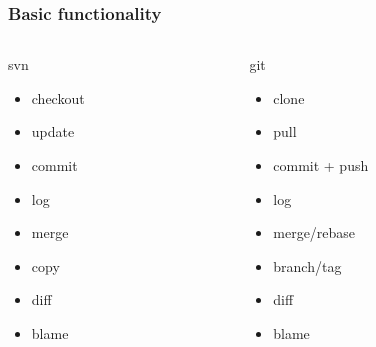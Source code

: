 \begin{frame}
	\frametitle{Basic functionality}
	\begin{columns}
		\begin{column}{0.49\textwidth}
			\begin{block}{svn}
				\begin{itemize}
					\item checkout
					\item update
					\item commit
					\item log
					\item merge
					\item copy
					\item diff
					\item blame
				\end{itemize}
			\end{block}
		\end{column}
		\begin{column}{0.49\textwidth}
			\begin{block}{git}
				\begin{itemize}
					\item clone
					\item pull
					\item commit + push
					\item log
					\item merge/rebase
					\item branch/tag
					\item diff
					\item blame
				\end{itemize}
			\end{block}
		\end{column}
	\end{columns}
\end{frame}
